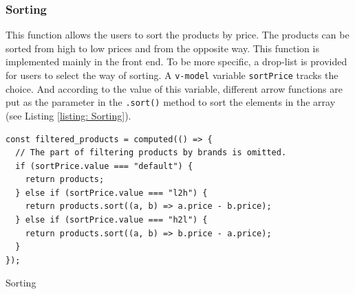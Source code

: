\documentclass{article}
\begin{document}
\subsubsection{Sorting}
This function allows the users to sort the products by price. The products can be sorted from high to low prices and from the opposite way. This function is implemented mainly in the front end. To be more specific, a drop-list is provided for users to select the way of sorting. A \verb|v-model| variable \verb|sortPrice| tracks the choice. And according to the value of this variable, different arrow functions are put as the parameter in the \verb|.sort()| method to sort the elements in the array (see Listing \ref{listing: Sorting}).
\begin{listing}[!htp]
\begin{verbatim}
const filtered_products = computed(() => {
  // The part of filtering products by brands is omitted.
  if (sortPrice.value === "default") {
    return products;
  } else if (sortPrice.value === "l2h") {
    return products.sort((a, b) => a.price - b.price);
  } else if (sortPrice.value === "h2l") {
    return products.sort((a, b) => b.price - a.price);
  }
});
\end{verbatim}
\caption{Sorting}
\label{listing: Sorting}
\end{listing}
\end{document}
